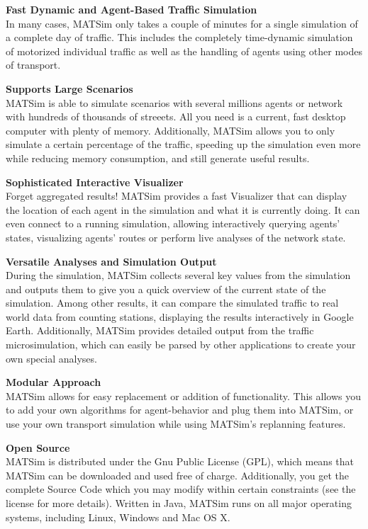 \documentclass[a4paper,11pt]{report}
\begin{document}
\textbf{Fast Dynamic and Agent-Based Traffic Simulation}
\\  In many cases, MATSim only takes a couple of minutes for a single  simulation of a complete day of traffic. This includes the completely  time-dynamic simulation of motorized individual traffic as well as the  handling of agents using other modes of transport.

\textbf{Supports Large Scenarios}
\\  MATSim is able to simulate scenarios with several millions agents or  network with hundreds of thousands of streeets. All you need is a  current, fast desktop computer with plenty of memory. Additionally,  MATSim allows you to only simulate a certain percentage of the traffic,  speeding up the simulation even more while reducing memory consumption,  and still generate useful results.

\textbf{Sophisticated Interactive Visualizer}
\\  Forget aggregated results! MATSim provides a fast Visualizer that can  display the location of each agent in the simulation and what it is  currently doing. It can even connect to a running simulation, allowing  interactively querying agents' states, visualizing agents' routes or  perform live analyses of the network state.

\textbf{Versatile Analyses and Simulation Output}
\\  During the simulation, MATSim collects several key values from the  simulation and outputs them to give you a quick overview of the current  state of the simulation. Among other results, it can compare the  simulated traffic to real world data from counting stations, displaying  the results interactively in Google Earth. Additionally, MATSim provides  detailed output from the traffic microsimulation, which can easily be  parsed by other applications to create your own special analyses.

\textbf{Modular Approach
\\}MATSim  allows for easy replacement or addition of functionality. This allows  you to add your own algorithms for agent-behavior and plug them into  MATSim, or use your own transport simulation while using MATSim's  replanning features.

\textbf{Open Source}
\\ MATSim is  distributed under the Gnu Public License (GPL), which means that MATSim  can be downloaded and used free of charge. Additionally, you get the  complete Source Code which you may modify within certain constraints  (see the license for more details). Written in Java, MATSim runs on all  major operating systems, including Linux, Windows and Mac OS X.
\end{document}
